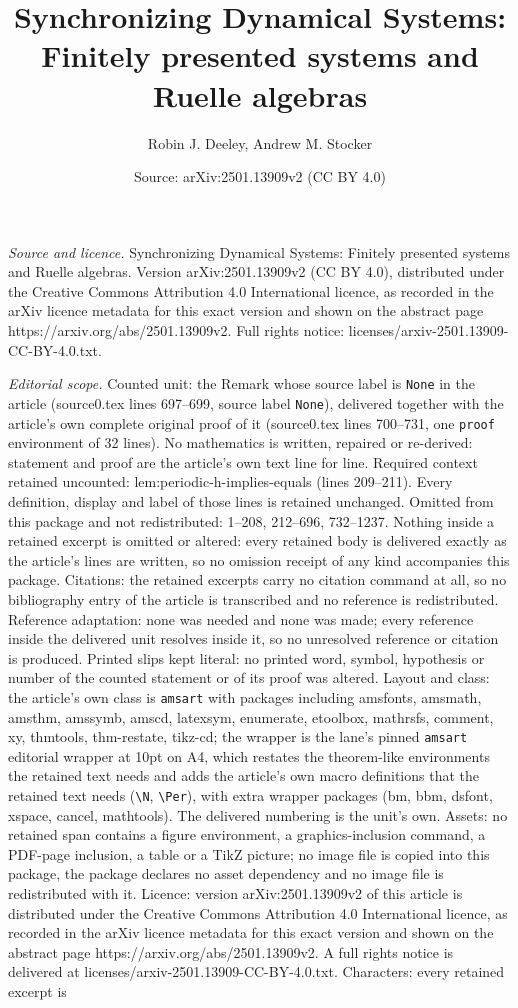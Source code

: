\documentclass[10pt,a4paper]{amsart}
\title[Synchronizing Dynamical Systems: Finitely presented systems ]{Synchronizing Dynamical Systems: Finitely presented systems and Ruelle algebras}
\author{Robin J. Deeley, Andrew M. Stocker}
\date{Source: arXiv:2501.13909v2 (CC BY 4.0)}
\begin{document}
\maketitle

\noindent\emph{Source and licence.} Synchronizing Dynamical Systems: Finitely presented systems and Ruelle algebras. Version arXiv:2501.13909v2 (CC BY 4.0), distributed under the Creative Commons Attribution 4.0 International licence, as recorded in the arXiv licence metadata for this exact version and shown on the abstract page https://arxiv.org/abs/2501.13909v2. Full rights notice: licenses/arxiv-2501.13909-CC-BY-4.0.txt.\par\smallskip

\noindent\textit{Editorial scope.} Counted unit: the Remark whose source label is \texttt{None} in the article (source0.tex lines 697--699, source label \texttt{None}), delivered together with the article's own complete original proof of it (source0.tex lines 700--731, one \texttt{proof} environment of 32 lines). No mathematics is written, repaired or re-derived: statement and proof are the article's own text line for line. Required context retained uncounted: lem:periodic-h-implies-equals (lines 209--211). Every definition, display and label of those lines is retained unchanged. Omitted from this package and not redistributed: 1--208, 212--696, 732--1237. Nothing inside a retained excerpt is omitted or altered: every retained body is delivered exactly as the article's lines are written, so no omission receipt of any kind accompanies this package. Citations: the retained excerpts carry no citation command at all, so no bibliography entry of the article is transcribed and no reference is redistributed. Reference adaptation: none was needed and none was made; every reference inside the delivered unit resolves inside it, so no unresolved reference or citation is produced. Printed slips kept literal: no printed word, symbol, hypothesis or number of the counted statement or of its proof was altered. Layout and class: the article's own class is \texttt{amsart} with packages including amsfonts, amsmath, amsthm, amssymb, amscd, latexsym, enumerate, etoolbox, mathrsfs, comment, xy, thmtools, thm-restate, tikz-cd; the wrapper is the lane's pinned \texttt{amsart} editorial wrapper at 10pt on A4, which restates the theorem-like environments the retained text needs and adds the article's own macro definitions that the retained text needs (\texttt{\textbackslash N}, \texttt{\textbackslash Per}), with extra wrapper packages (bm, bbm, dsfont, xspace, cancel, mathtools). The delivered numbering is the unit's own. Assets: no retained span contains a figure environment, a graphics-inclusion command, a PDF-page inclusion, a table or a TikZ picture; no image file is copied into this package, the package declares no asset dependency and no image file is redistributed with it. Licence: version arXiv:2501.13909v2 of this article is distributed under the Creative Commons Attribution 4.0 International licence, as recorded in the arXiv licence metadata for this exact version and shown on the abstract page https://arxiv.org/abs/2501.13909v2. A full rights notice is delivered at licenses/arxiv-2501.13909-CC-BY-4.0.txt. Characters: every retained excerpt is 
\end{document}
